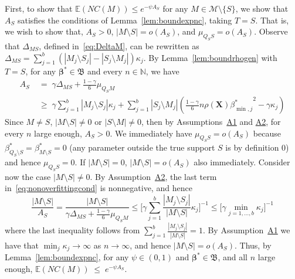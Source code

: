 \documentclass[
  12pt]{article}
\newcommand{\E}{\mathbb{E}}
\newcommand{\N}{\mathbb{N}}
\newcommand{\bbeta}{\boldsymbol{\beta}}
\newcommand{\bX}{\mathbf{X}}
\newcommand{\bB}{\mathfrak{B}}
\begin{document}
First, to show that $\E(NC(M)) \leq e^{-\psi A_S}$
for any $M\in\mathcal{M}\setminus \{S\}$, we show that $A_S$ satisfies the conditions of Lemma~\ref{lem:boundexpnc}, taking $T=S$. 
That is, we wish to show that, $A_S>0$, $|M\setminus S|=o(A_S)$, and $\mu_{Q_S S}=o(A_S)$. 
Observe that $\Delta_{MS}$, defined in~\eqref{eq:DeltaM}, can be rewritten as $\Delta_{MS}=\sum_{j=1}^b(|M_j\setminus S_j|-|S_j\setminus M_j|)\kappa_j$. By  Lemma~\ref{lem:boundrhogen} with $T=S$, for any $\bbeta^*\in\bB$ and every $n\in \N$, we have 
\begin{equation}\label{eq:nonoverfittingcond}
\begin{aligned}
     A_S & \;=\; \gamma \Delta_{MS}+\frac{1-\gamma}{6}\mu_{Q_SM}\\
     & \;\geq\;  \gamma\sum_{j=1}^b|M_j \setminus S_j|\kappa_j + \sum_{j=1}^b |S_j\setminus M_j |\left(\tfrac{1-\gamma}{6} n \rho(\bX) {\beta^*_{\min,j}}^{2} - \gamma\kappa_j\right) 
\end{aligned}
\end{equation} 
Since $M\neq S$, $|M\setminus S|\neq0$ or $|S\setminus M|\neq0$, then by Assumptions~\hyperlink{lab:A1}{A1} and \hyperlink{lab:A2}{A2}, for every $n$ large enough, $A_S>0$. We immediately have $\mu_{Q_S S}=o(A_S)$ because $\beta^*_{Q_S\setminus S}=\beta^*_{M\setminus S}=0$ (any parameter outside the true support $S$ is by definition 0) and hence $\mu_{Q_S S}=0$.
If $|M\setminus S|=0$, $|M\setminus S|=o(A_S)$ also immediately. Consider now the case $|M\setminus S|\neq 0$. By Assumption~\hyperlink{lab:A2}{A2}, the last term in~\eqref{eq:nonoverfittingcond} is nonnegative, and hence
$$\frac{|M\setminus S|}{A_S}
= \frac{|M\setminus S|}{\gamma \Delta_{MS}+\frac{1-\gamma}{6}\mu_{Q_SM}}
\leq \bigg[ \gamma\sum_{j=1}^b\frac{|M_j \setminus S_j|}{|M\setminus S|}\kappa_j \bigg]^{-1} \leq \Big[ \gamma\min_{j=1,\ldots,b}\kappa_j \Big]^{-1} $$
where the last inequality follows from $\sum_{j=1}^b\frac{|M_j \setminus S_j|}{|M\setminus S|}=1$. By Assumption~\hyperlink{lab:A1}{A1} we have that $\min_j \kappa_j \to \infty$ as $n \rightarrow \infty$, and hence $|M\setminus S|=o(A_S)$. Thus,
by Lemma~\ref{lem:boundexpnc}, for any $\psi\in(0,1)$ and $\bbeta^*\in \bB$, and all $n$ large enough,
$
\E(NC(M))\;\leq\;e^{-\psi A_S}.
$
\end{document}
